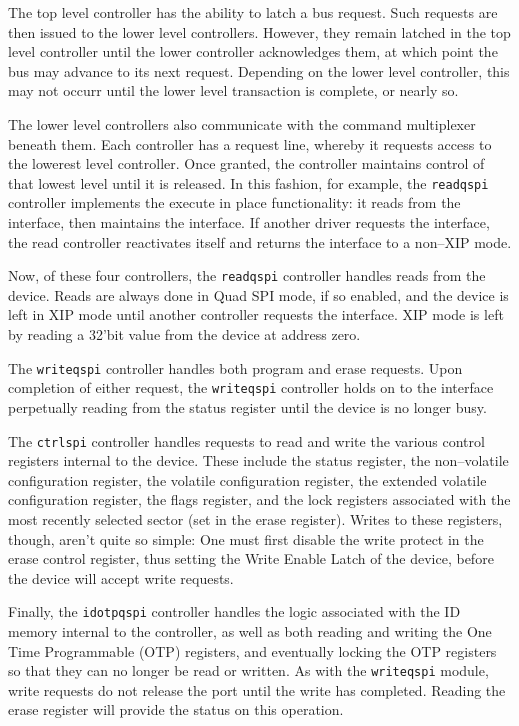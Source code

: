 \documentclass{gqtekspec}
\begin{document}
The top level controller has the ability to latch a bus request.  Such requests
are then issued to the lower level controllers.  However, they remain latched
in the top level controller until the lower controller acknowledges them, at
which point the bus may advance to its next request.  Depending on the lower
level controller, this may not occurr until the lower level transaction is
complete, or nearly so.

The lower level controllers also communicate with the command multiplexer
beneath them.  Each controller has a request line, whereby it requests access
to the lowerest level controller.  Once granted, the controller maintains 
control of that lowest level until it is released.  In this fashion, for
example, the {\tt readqspi} controller implements the execute in place 
functionality: it reads from the interface, then maintains the interface.
If another driver requests the interface, the read controller reactivates
itself and returns the interface to a non--XIP mode.

Now, of these four controllers, the {\tt readqspi} controller handles reads
from the device.  Reads are always done in Quad SPI mode, if so enabled,
and the device is left in XIP mode until another controller requests the
interface.  XIP mode is left by reading a 32'bit value from the device at
address zero.

The {\tt writeqspi} controller handles both program and erase requests.
Upon completion of either request, the {\tt writeqspi} controller holds on
to the interface perpetually reading from the status register until the device
is no longer busy.

The {\tt ctrlspi} controller handles requests to read and write the various
control registers internal to the device.  These include the status register,
the non--volatile configuration register, the volatile configuration register,
the extended volatile configuration register, the flags register, and the
lock registers associated with the most recently selected sector (set in the
erase register).  Writes to these registers, though, aren't quite so simple:
One must first disable the write protect in the erase control register,
thus setting the Write Enable Latch of the device, before the device
will accept write requests.

Finally, the {\tt idotpqspi} controller handles the logic associated with the
ID memory internal to the controller, as well as both reading and writing the
One Time Programmable (OTP) registers, and eventually locking the OTP registers
so that they can no longer be read or written.  As with the {\tt writeqspi}
module, write requests do not release the port until the write has completed.
Reading the erase register will provide the status on this operation.
\end{document}
